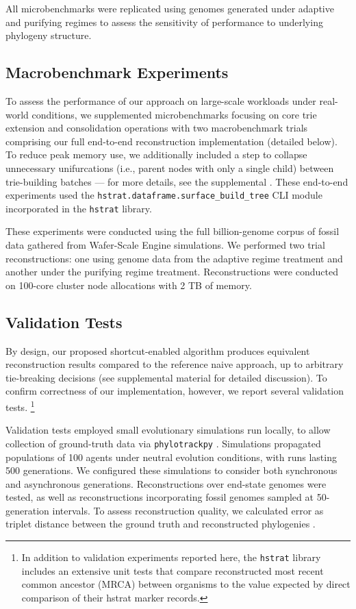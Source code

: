 All microbenchmarks were replicated using genomes generated under adaptive and purifying regimes to assess the sensitivity of performance to underlying phylogeny structure.

\subsection{Macrobenchmark Experiments}

To assess the performance of our approach on large-scale workloads under real-world conditions, we supplemented microbenchmarks focusing on core trie extension and consolidation operations with two macrobenchmark trials comprising our full end-to-end reconstruction implementation (detailed below).
To reduce peak memory use, we additionally included a step to collapse unnecessary unifurcations (i.e., parent nodes with only a single child) between trie-building batches --- for more details, see the supplemental \citep{supplemental}.
These end-to-end experiments used the \texttt{hstrat.dataframe.surface\_build\_tree} CLI module incorporated in the \texttt{hstrat} library.

These experiments were conducted using the full billion-genome corpus of fossil data gathered from Wafer-Scale Engine simulations.
We performed two trial reconstructions: one using genome data from the adaptive regime treatment and another under the purifying regime treatment.
Reconstructions were conducted on 100-core cluster node allocations with 2 TB of memory.

\subsection{Validation Tests}

By design, our proposed shortcut-enabled algorithm produces equivalent reconstruction results compared to the reference naive approach, up to arbitrary tie-breaking decisions (see supplemental material \citep{supplemental} for detailed discussion).
To confirm correctness of our implementation, however, we report several validation tests.%
\footnote{In addition to validation experiments reported here, the \texttt{hstrat} library includes an extensive unit tests that compare reconstructed most recent common ancestor (MRCA) between organisms to the value expected by direct comparison of their hstrat marker records.}

Validation tests employed small evolutionary simulations run locally, to allow collection of ground-truth data via \texttt{phylotrackpy} \citep{dolson2024phylotrack}.
Simulations propagated populations of 100 agents under neutral evolution conditions, with runs lasting 500 generations.
We configured these simulations to consider both synchronous and asynchronous generations.
Reconstructions over end-state genomes were tested, as well as reconstructions incorporating fossil genomes sampled at 50-generation intervals.
To assess reconstruction quality, we calculated error as triplet distance between the ground truth and reconstructed phylogenies \citep{critchlow1996triples}.

